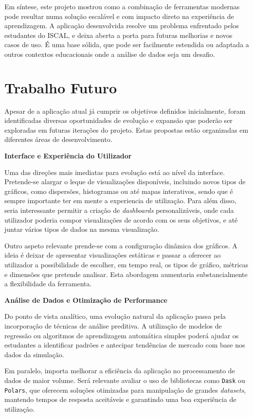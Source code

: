 Em síntese, este projeto mostrou como a combinação de ferramentas modernas pode resultar numa solução escalável e com impacto direto na experiência de aprendizagem. A aplicação desenvolvida resolve um problema enfrentado pelos estudantes do ISCAL, e deixa aberta a porta para futuras melhorias e novos casos de uso. É uma base sólida, que pode ser facilmente estendida ou adaptada a outros contextos educacionais onde a análise de dados seja um desafio.

\section{Trabalho Futuro}

Apesar de a aplicação atual já cumprir os objetivos definidos inicialmente, foram identificadas diversas oportunidades de evolução e expansão que poderão ser exploradas em futuras iterações do projeto. Estas propostas estão organizadas em diferentes áreas de desenvolvimento.

\textbf{Interface e Experiência do Utilizador}

Uma das direções mais imediatas para evolução está ao nível da interface. Pretende-se alargar o leque de visualizações disponíveis, incluindo novos tipos de gráficos, como dispersões, histogramas ou até mapas interativos, sendo que é sempre importante ter em mente a experiencia de utilização. Para além disso, seria interessante permitir a criação de \textit{dashboards} personalizáveis, onde cada utilizador poderia compor visualizações de acordo com os seus objetivos, e até juntar vários tipos de dados na mesma visualização.

Outro aspeto relevante prende-se com a configuração dinâmica dos gráficos. A ideia é deixar de apresentar visualizações estáticas e passar a oferecer ao utilizador a possibilidade de escolher, em tempo real, os tipos de gráfico, métricas e dimensões que pretende analisar. Esta abordagem aumentaria substancialmente a flexibilidade da ferramenta.

\textbf{Análise de Dados e Otimização de Performance}

Do ponto de vista analítico, uma evolução natural da aplicação passa pela incorporação de técnicas de análise preditiva. A utilização de modelos de regressão ou algoritmos de aprendizagem automática simples poderá ajudar os estudantes a identificar padrões e antecipar tendências de mercado com base nos dados da simulação.

Em paralelo, importa melhorar a eficiência da aplicação no processamento de dados de maior volume. Será relevante avaliar o uso de bibliotecas como \texttt{Dask} ou \texttt{Polars}, que oferecem soluções otimizadas para manipulação de grandes \textit{datasets}, mantendo tempos de resposta aceitáveis e garantindo uma boa experiência de utilização.

